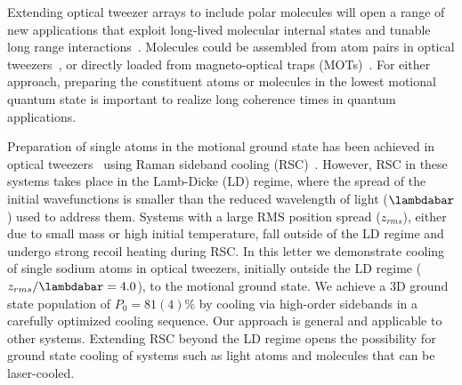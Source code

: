 \documentclass[aps,prl,twocolumn,groupedaddress]{revtex4-1}
\begin{document}
Extending optical tweezer arrays  to include polar molecules will open  a  range of
new applications that exploit  long-lived molecular internal states
and  tunable long range interactions~\cite{DeMille2002,Gorshkov2011,Yan2013}.
Molecules could be assembled from atom pairs in  optical tweezers~\cite{Liu2017},
or directly loaded from magneto-optical traps
(MOTs)~\cite{Barry2014,Truppe2017SubDoppler,Anderegg2017}.
For either approach, preparing the constituent atoms or molecules in the lowest motional
quantum state is important to realize long coherence times in quantum applications.

Preparation of single atoms in the motional ground state has been achieved in optical tweezers~\cite{Kaufman2012,Thompson2013,Liu2017,Robens2017}
 using Raman sideband cooling (RSC)~\cite{Monroe1995,Kerman2000,Han2000}.
However, RSC in these systems takes place in the Lamb-Dicke (LD) regime, where
the spread of the initial wavefunctions is  smaller than the reduced wavelength of light ($\lambdabar$)
used to address them.
Systems with a large RMS position spread ($z_{rms}$), either due to small mass or high initial temperature,
fall outside of the LD regime and undergo strong recoil heating during RSC.
In this letter we demonstrate cooling of single sodium atoms in optical tweezers,
initially outside  the LD regime ($z_{rms}/\lambdabar=4.0$), to the motional ground state.
We achieve a 3D ground state population of $P_0=81(4)$\% by  cooling via
 high-order sidebands in a carefully optimized cooling sequence.
Our approach is general and applicable to %
other systems.  Extending RSC beyond the LD regime opens  the possibility
for ground state cooling of systems such as light atoms and %
molecules that can be laser-cooled.
\end{document}
